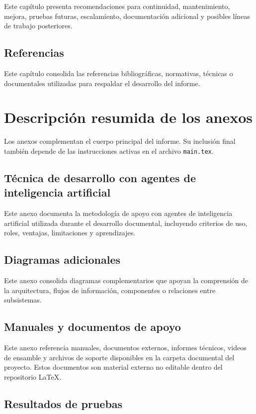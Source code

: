 Este capítulo presenta recomendaciones para continuidad, mantenimiento, mejora, pruebas futuras, escalamiento, documentación adicional y posibles líneas de trabajo posteriores.

\subsection{Referencias}

Este capítulo consolida las referencias bibliográficas, normativas, técnicas o documentales utilizadas para respaldar el desarrollo del informe.

\section{Descripción resumida de los anexos}

Los anexos complementan el cuerpo principal del informe. Su inclusión final también depende de las instrucciones activas en el archivo \texttt{main.tex}.

\subsection{Técnica de desarrollo con agentes de inteligencia artificial}

Este anexo documenta la metodología de apoyo con agentes de inteligencia artificial utilizada durante el desarrollo documental, incluyendo criterios de uso, roles, ventajas, limitaciones y aprendizajes.

\subsection{Diagramas adicionales}

Este anexo consolida diagramas complementarios que apoyan la comprensión de la arquitectura, flujos de información, componentes o relaciones entre subsistemas.

\subsection{Manuales y documentos de apoyo}

Este anexo referencia manuales, documentos externos, informes técnicos, videos de ensamble y archivos de soporte disponibles en la carpeta documental del proyecto. Estos documentos son material externo no editable dentro del repositorio \LaTeX.

\subsection{Resultados de pruebas}


